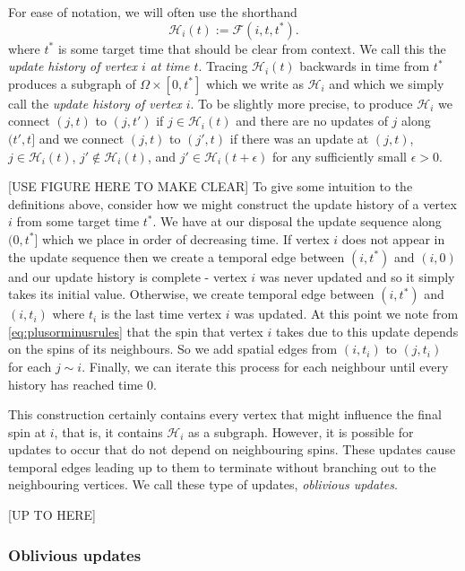 	For ease of notation, we will often use the shorthand
	\begin{equation}
		\mathcal{H}_i(t) := \mathscr{F}(i, t, t^*).
	\end{equation}
	where $t^*$ is some target time that should be clear from context. We call this the \emph{update history of vertex $i$ at time $t$}. Tracing $\mathcal{H}_i(t)$ backwards in time from $t^*$ produces a subgraph of $\Omega \times [0, t^*]$ which we write as $\mathcal{H}_i$ and which we simply call the \emph{update history of vertex $i$}. To be slightly more precise, to produce $\mathcal{H}_i$ we connect $(j,t)$ to $(j,t')$ if $j \in \mathcal{H}_i(t)$ and there are no updates of $j$ along $(t', t]$ and we connect $(j,t)$ to $(j',t)$ if there was an update at $(j, t)$, $j \in \mathcal{H}_i(t)$, $j' \notin \mathcal{H}_i(t)$, and $j' \in \mathcal{H}_i(t+\epsilon)$ for any sufficiently small $\epsilon > 0$.

	

	[USE FIGURE HERE TO MAKE CLEAR]
	To give some intuition to the definitions above, consider how we might construct the update history of a vertex $i$ from some target time $t^*$. We have at our disposal the update sequence along $(0, t^*]$ which we place in order of decreasing time. If vertex $i$ does not appear in the update sequence then we create a temporal edge between $(i, t^*)$ and $(i, 0)$ and our update history is complete - vertex $i$ was never updated and so it simply takes its initial value. Otherwise, we create temporal edge between $(i, t^*)$ and $(i, t_i)$ where $t_i$ is the last time vertex $i$ was updated. At this point we note from \eqref{eq:plusorminusrules} that the spin that vertex $i$ takes due to this update depends on the spins of its neighbours. So we add spatial edges from $(i, t_i)$ to $(j, t_i)$ for each $j\sim i$. Finally, we can iterate this process for each neighbour until every history has reached time $0$.

	This construction certainly contains every vertex that might influence the final spin at $i$, that is, it contains $\mathcal{H}_i$ as a subgraph. However, it is possible for updates to occur that do not depend on neighbouring spins. These updates cause temporal edges leading up to them to terminate without branching out to the neighbouring vertices. We call these type of updates, \emph{oblivious updates}.

	[UP TO HERE]

	\subsubsection{Oblivious updates}

